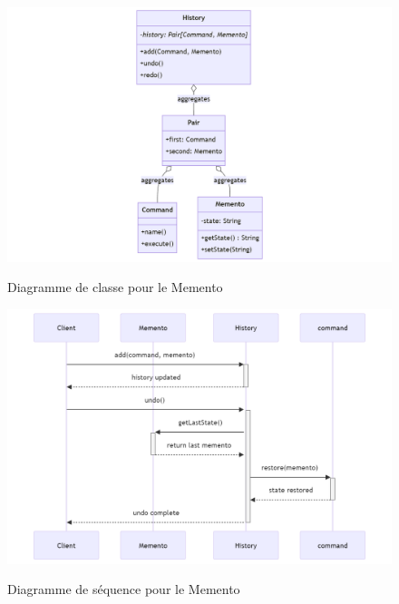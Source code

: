 \documentclass[a4paper,11pt]{article}
\begin{document}
\begin{enumerate}
    \begin{figure} [!ht]
        \centering
        \caption{Diagramme de classe pour le Memento}
        \includegraphics[scale=0.3]{classe_memento.png}
        \label{fig:MementoClassDiagram}
    \end{figure}

    \begin{figure} [!ht]
        \centering
        \caption{Diagramme de séquence pour le Memento}
        \includegraphics[scale=0.3]{sequence_memento.png}
        \label{fig:MementoSequenceDiagram}
    \end{figure}
\end{enumerate}

\pagebreak
\end{document}
